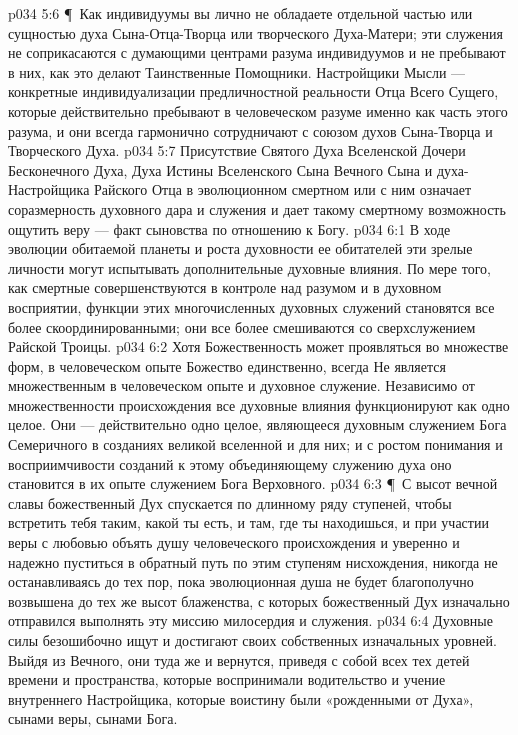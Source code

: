 \vs p034 5:6 \P\ Как индивидуумы вы лично не обладаете отдельной частью или сущностью духа Сына\hyp{}Отца\hyp{}Творца или творческого Духа\hyp{}Матери; эти служения не соприкасаются с думающими центрами разума индивидуумов и не пребывают в них, как это делают Таинственные Помощники. Настройщики Мысли --- конкретные индивидуализации предличностной реальности Отца Всего Сущего, которые действительно пребывают в человеческом разуме именно как часть этого разума, и они всегда гармонично сотрудничают с союзом духов Сына\hyp{}Творца и Творческого Духа.
\vs p034 5:7 Присутствие Святого Духа Вселенской Дочери Бесконечного Духа, Духа Истины Вселенского Сына Вечного Сына и духа\hyp{}Настройщика Райского Отца в эволюционном смертном или с ним означает соразмерность духовного дара и служения и дает такому смертному возможность ощутить веру --- факт сыновства по отношению к Богу.
\vs p034 6:1 В ходе эволюции обитаемой планеты и роста духовности ее обитателей эти зрелые личности могут испытывать дополнительные духовные влияния. По мере того, как смертные совершенствуются в контроле над разумом и в духовном восприятии, функции этих многочисленных духовных служений становятся все более скоординированными; они все более смешиваются со сверхслужением Райской Троицы.
\vs p034 6:2 Хотя Божественность может проявляться во множестве форм, в человеческом опыте Божество единственно, всегда  Не является множественным в человеческом опыте и духовное служение. Независимо от множественности происхождения все духовные влияния функционируют как одно целое. Они --- действительно одно целое, являющееся духовным служением Бога Семеричного в созданиях великой вселенной и для них; и с ростом понимания и восприимчивости созданий к этому объединяющему служению духа оно становится в их опыте служением Бога Верховного.
\vs p034 6:3 \P\ С высот вечной славы божественный Дух спускается по длинному ряду ступеней, чтобы встретить тебя таким, какой ты есть, и там, где ты находишься, и при участии веры с любовью объять душу человеческого происхождения и уверенно и надежно пуститься в обратный путь по этим ступеням нисхождения, никогда не останавливаясь до тех пор, пока эволюционная душа не будет благополучно возвышена до тех же высот блаженства, с которых божественный Дух изначально отправился выполнять эту миссию милосердия и служения.
\vs p034 6:4 Духовные силы безошибочно ищут и достигают своих собственных изначальных уровней. Выйдя из Вечного, они туда же и вернутся, приведя с собой всех тех детей времени и пространства, которые воспринимали водительство и учение внутреннего Настройщика, которые воистину были «рожденными от Духа», сынами веры, сынами Бога.
